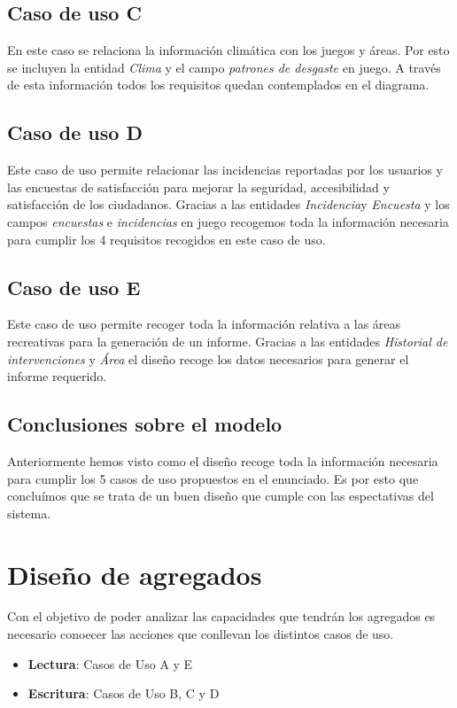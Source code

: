 \documentclass[]{article}
\begin{document}
\subsection{Caso de uso C}
\label{subsec:casoC}
En este caso se relaciona la información climática con los juegos y áreas. Por esto se incluyen la entidad \textit{Clima} y el campo \textit{patrones de desgaste} en juego. A través de esta información todos los requisitos quedan contemplados en el diagrama.

\subsection{Caso de uso D}
\label{subsec:casoD}
Este caso de uso permite relacionar las incidencias reportadas por los usuarios y las encuestas de satisfacción para mejorar la seguridad, accesibilidad y satisfacción de los ciudadanos. Gracias a las entidades \textit{Incidencia}y \textit{Encuesta} y los campos \textit{encuestas} e \textit{incidencias} en juego recogemos toda la información necesaria para cumplir los 4 requisitos recogidos en este caso de uso.

\subsection{Caso de uso E}
\label{subsec:casoE}
Este caso de uso permite recoger toda la información relativa a las áreas recreativas para la generación de un informe. Gracias a las entidades \textit{Historial de intervenciones} y \textit{Área} el diseño recoge los datos necesarios para generar el informe requerido.

\subsection{Conclusiones sobre el modelo}
\label{subsec:conclusiones-modelo}
Anteriormente hemos visto como el diseño recoge toda la información necesaria para cumplir los 5 casos de uso propuestos en el enunciado. Es por esto que concluímos que se trata de un buen diseño que cumple con las espectativas del sistema.

\newpage
\section{Diseño de agregados}
\label{sec:agregados}
Con el objetivo de poder analizar las capacidades que tendrán los agregados es necesario conoecer las acciones que conllevan los distintos casos de uso.
\begin{itemize}
    \item \textbf{Lectura}: Casos de Uso A y E
    \item \textbf{Escritura}: Casos de Uso B, C y D
\end{itemize}
\end{document}
